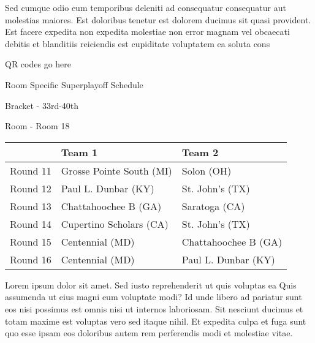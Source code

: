 \documentclass{article}%
\begin{document}
\newline%
    Sed cumque odio eum temporibus deleniti ad consequatur consequatur aut molestias maiores. Est doloribus tenetur est dolorem ducimus sit quasi provident. Est facere expedita non expedita molestiae non error magnam vel obcaecati debitis et blanditiis reiciendis est cupiditate voluptatem ea soluta cons%
\vspace*{140pt}%
\begin{center}%
\begin{Huge}%
QR codes go here%
\end{Huge}%
\end{center}%
\newpage%
\begin{center}%
\begin{Huge}%
Room Specific Superplayoff Schedule%
\end{Huge}%
\vspace*{8pt}%
\linebreak%
\begin{Large}%
Bracket {-} 33rd{-}40th%
\end{Large}%
\vspace*{8pt}%
\linebreak%
\vspace*{8pt}%
\begin{Large}%
Room {-} Room 18%
\end{Large}%
\end{center}%
%
\begin{tabularx}{\textwidth}{|c|Y|Y|}%
\hline%
&Team 1&Team 2\\%
\hline%
Round 11&Grosse Pointe South (MI)&Solon (OH)\\%
Round 12&Paul L. Dunbar (KY)&St. John's (TX)\\%
Round 13&Chattahoochee B (GA)&Saratoga (CA)\\%
Round 14&Cupertino Scholars (CA)&St. John's (TX)\\%
Round 15&Centennial (MD)&Chattahoochee B (GA)\\%
Round 16&Centennial (MD)&Paul L. Dunbar (KY)\\%
\hline%
\end{tabularx}%
\vspace*{8pt}%
\newline%
    Lorem ipsum dolor sit amet. Sed iusto reprehenderit ut quis voluptas ea Quis assumenda ut eius magni eum voluptate modi? Id unde libero ad pariatur sunt eos nisi possimus est omnis nisi ut internos laboriosam. Sit nesciunt ducimus et totam maxime est voluptas vero sed itaque nihil. Et expedita culpa et fuga sunt quo esse ipsam eos doloribus autem rem perferendis modi et molestiae vitae.\newline%
\end{document}
